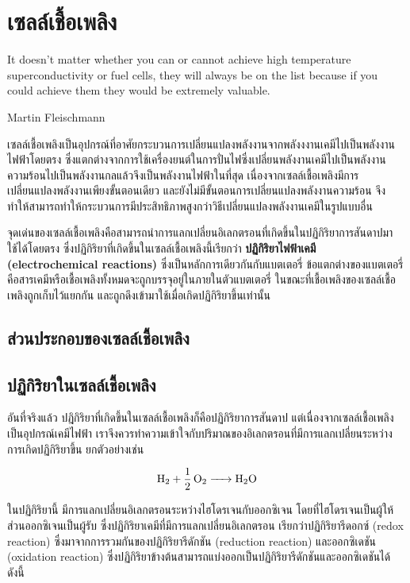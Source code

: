 \documentclass[a4paper,nobib,openany,10pt]{tufte-book}
\begin{document}
\chapter{เซลล์เชื้อเพลิง}
\label{sec:orgf4dd503}

\epigraph{It doesn't matter whether you can or cannot achieve high temperature superconductivity or fuel cells, they will always be on the list because if you could achieve them they would be extremely valuable.}{Martin Fleischmann}

เซลล์เชื้อเพลิงเป็นอุปกรณ์ที่อาศัยกระบวนการเปลี่ยนแปลงพลังงานจากพลังงงานเคมีไปเป็นพลังงานไฟฟ้าโดยตรง
ซึ่งแตกต่างจากการใช้เครื่องยนต์ในการปั่นไฟซึ่งเปลี่ยนพลังงานเคมีไปเป็นพลังงานความร้อนไปเป็นพลังงานกลแล้วจึงเป็นพลังงานไฟฟ้าในที่สุด
เนื่องจากเซลล์เชื้อเพลิงมีการเปลี่ยนแปลงพลังงานเพียงขั้นตอนเดียว
และยังไม่มีขั้นตอนการเปลี่ยนแปลงพลังงานความร้อน
จึงทำให้สามารถทำให้กระบวนการมีประสิทธิภาพสูงกว่าวิธีเปลี่ยนแปลงพลังงานเคมีในรูปแบบอื่น

จุดเด่นของเซลล์เชื้อเพลิงคือสามารถนำการแลกเปลี่ยนอิเลกตรอนที่เกิดขึ้นในปฏิกิริยาการสันดาปมาใช้ได้โดยตรง
ซึ่งปฏิกิริยาที่เกิดขึ้นในเซลล์เชื้อเพลิงนี้เรียกว่า \textbf{ปฏิกิริยาไฟฟ้าเคมี
(electrochemical reactions)} ซึ่งเป็นหลักการเดียวกันกับแบตเตอรี่
ข้อแตกต่างของแบตเตอรี่คือสารเคมีหรือเชื้อเพลิงทั้งหมดจะถูกบรรจุอยู่ในภายในตัวแบตเตอรี่
ในขณะที่เชื้อเพลิงของเซลล์เชื้อเพลิงถูกเก็บไว้แยกกัน
และถูกดึงเข้ามาใช้เมื่อเกิดปฏิกิริยาขึ้นเท่านั้น

\section{ส่วนประกอบของเซลล์เชื้อเพลิง}
\label{sec:org23d6a6f}
\section{ปฏิกิริยาในเซลล์เชื้อเพลิง}
\label{sec:orgf1fbdfc}
อันที่จริงแล้ว
ปฎิกิริยาที่เกิดขึ้นในเซลล์เชื้อเพลิงก็คือปฏิกิริยาการสันดาป
แต่เนื่องจากเซลล์เชื้อเพลิงเป็นอุปกรณ์เคมีไฟฟ้า
เราจึงควรทำความเข้าใจกับปริมาณของอิเลกตรอนที่มีการแลกเปลี่ยนระหว่างการเกิดปฏิกิริยาขึ้น
ยกตัวอย่างเช่น

\[ \ce{H2 + 1/2O2 -> H2O} \]

ในปฏิกิริยานี้ มีการแลกเปลี่ยนอิเลกตรอนระหว่างไฮโดรเจนกับออกซิเจน
โดยที่ไฮโดรเจนเป็นผู้ให้ ส่วนออกซิเจนเป็นผู้รับ
ซึ่งปฏิกิริยาเคมีที่มีการแลกเปลี่ยนอิเลกตรอน เรียกว่าปฏิกิริยารีดอกซ์
(redox reaction) ซึ่งมาจากการรวมกันของปฏิกิริยารีดักชัน (reduction
reaction) และออกซิเดชัน (oxidation reaction)
ซึ่งปฏิกิริยาข้างต้นสามารถแบ่งออกเป็นปฏิกิริยารีดักชันและออกซิเดชันได้ดังนี้
\end{document}
